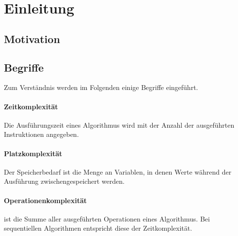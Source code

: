 \section{Einleitung}

\subsection{Motivation}

\subsection{Begriffe}
Zum Verständnis werden im Folgenden einige Begriffe eingeführt.

\paragraph{Zeitkomplexität}
Die Ausführungszeit eines Algorithmus wird mit der Anzahl der ausgeführten Instruktionen angegeben.

\paragraph{Platzkomplexität}
Der Speicherbedarf ist die Menge an Variablen, in denen Werte während der Ausführung zwischengespeichert werden.

\paragraph{Operationenkomplexität}
ist die Summe aller ausgeführten Operationen eines Algorithmus. Bei sequentiellen Algorithmen entspricht diese der Zeitkomplexität.
